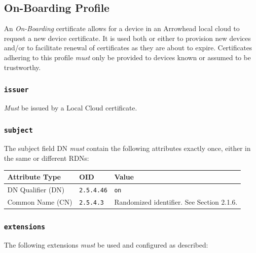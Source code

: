 \newpage
\subsection{On-Boarding Profile}

An \textit{On-Boarding} certificate allows for a device in an Arrowhead local cloud to request a new device certificate.
It is used both or either to provision new devices and/or to facilitate renewal of certificates as they are about to expire.
Certificates adhering to this profile \textit{must} only be provided to devices known or assumed to be trustworthy.

\subsubsection{\texttt{issuer}}

\textit{Must} be issued by a Local Cloud certificate.

\subsubsection{\texttt{subject}}

The subject field DN \textit{must} contain the following attributes exactly once, either in the same or different RDNs:

\vspace*{0.5cm}
\noindent\begin{tabularx}{\textwidth}{| p{4cm} | p{2cm} | X |} \hline
\rowcolor{gray!33} Attribute Type & OID               & Value \\ \hline

DN Qualifier (DN)                 & \texttt{2.5.4.46} & \texttt{on} \\ \hline
Common Name (CN)                  & \texttt{2.5.4.3}  &  Randomized identifier. See Section 2.1.6. \\ \hline

\end{tabularx}
\vspace*{0.5cm}

\subsubsection{\texttt{extensions}}

The following extensions \textit{must} be used and configured as described:

